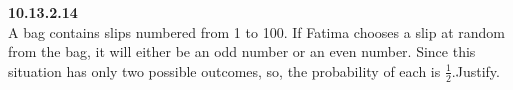 \documentclass[11pt]{book}
\begin{document}
\textbf{10.13.2.14}\\
A bag contains slips numbered from 1 to 100. If Fatima chooses a slip at random
from the bag, it will either be an odd number or an even number. Since this situation
has only two possible outcomes, so, the probability of each is $\frac{1}{2}$.Justify.
\end{document}

